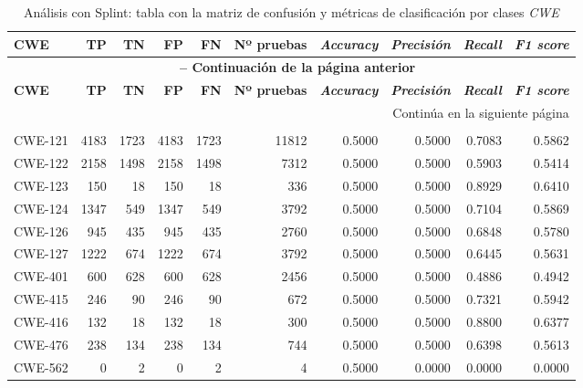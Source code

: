 \documentclass[12pt, a4paper, twoside]{article}
\begin{document}
\begin{longtable}{lrrrrrrrrr}
	\caption{Análisis con Splint: tabla con la matriz de confusión y métricas de clasificación por clases \textit{CWE}}
	\label{fig:resultados-cwe-splint} \\
	\toprule
	\textbf{CWE} & \textbf{TP} & \textbf{TN} & \textbf{FP} & \textbf{FN} & \textbf{Nº pruebas} & \textbf{\textit{Accuracy}} & \textbf{\textit{Precisión}} & \textbf{\textit{Recall}} & \textbf{\textit{F1 score}} \\
	\midrule
	\endfirsthead
	\multicolumn{10}{c}{{\bfseries \tablename\ \thetable{} -- Continuación de la página anterior}} \\
	\toprule
	\textbf{CWE} & \textbf{TP} & \textbf{TN} & \textbf{FP} & \textbf{FN} & \textbf{Nº pruebas} & \textbf{\textit{Accuracy}} & \textbf{\textit{Precisión}} & \textbf{\textit{Recall}} & \textbf{\textit{F1 score}} \\
	\midrule
	\endhead
	\midrule
	\multicolumn{10}{r}{Continúa en la siguiente página} \\
	\endfoot
	\midrule
	\multicolumn{10}{l}{\textbf{\textit{Global Accuracy}:} 0.50 (50\%) -- Total de pruebas: 36.084} \\
	\bottomrule
	\endlastfoot
	CWE-121 & 4183 & 1723 & 4183 & 1723 & 11812 & 0.5000 & 0.5000 & 0.7083 & 0.5862 \\
	CWE-122 & 2158 & 1498 & 2158 & 1498 & 7312  & 0.5000 & 0.5000 & 0.5903 & 0.5414 \\
	CWE-123 & 150  & 18   & 150  & 18   & 336   & 0.5000 & 0.5000 & 0.8929 & 0.6410 \\
	CWE-124 & 1347 & 549  & 1347 & 549  & 3792  & 0.5000 & 0.5000 & 0.7104 & 0.5869 \\
	CWE-126 & 945  & 435  & 945  & 435  & 2760  & 0.5000 & 0.5000 & 0.6848 & 0.5780 \\
	CWE-127 & 1222 & 674  & 1222 & 674  & 3792  & 0.5000 & 0.5000 & 0.6445 & 0.5631 \\
	CWE-401 & 600  & 628  & 600  & 628  & 2456  & 0.5000 & 0.5000 & 0.4886 & 0.4942 \\
	CWE-415 & 246  & 90   & 246  & 90   & 672   & 0.5000 & 0.5000 & 0.7321 & 0.5942 \\
	CWE-416 & 132  & 18   & 132  & 18   & 300   & 0.5000 & 0.5000 & 0.8800 & 0.6377 \\
	CWE-476 & 238  & 134  & 238  & 134  & 744   & 0.5000 & 0.5000 & 0.6398 & 0.5613 \\
	CWE-562 & 0    & 2    & 0    & 2    & 4     & 0.5000 & 0.0000 & 0.0000 & 0.0000 \\

\end{longtable}
\end{document}
